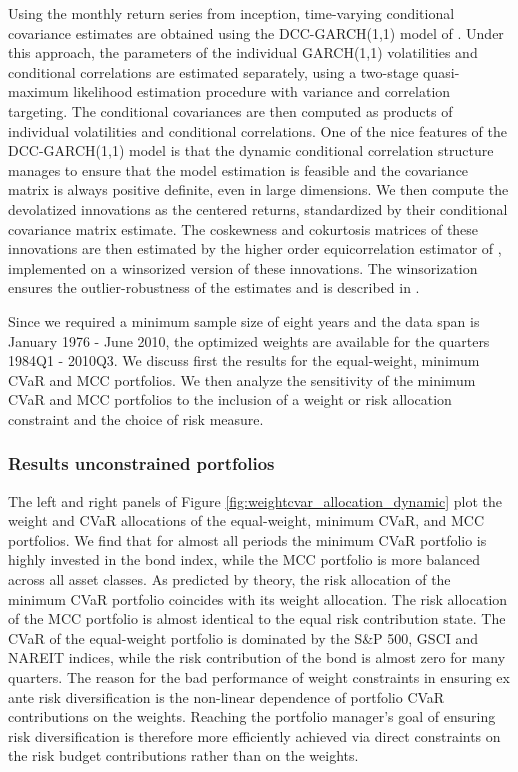 \documentclass[12pt,a4paper]{article}
\begin{document}
Using the monthly return series from inception, time-varying conditional covariance estimates are obtained using the DCC-GARCH(1,1) model of \citet{EngleDCC02}. Under this approach, the parameters of the individual GARCH(1,1) volatilities and conditional correlations are estimated separately, using a two-stage quasi-maximum likelihood estimation procedure with variance and correlation targeting. The conditional covariances are then computed as products of individual volatilities and conditional correlations. One of the nice features of the DCC-GARCH(1,1) model is that the dynamic  conditional correlation structure manages to ensure that the model
estimation is feasible and the covariance matrix is always positive definite, even in large dimensions.
  We then compute the devolatized innovations as the centered returns, standardized by their conditional covariance matrix estimate.  The coskewness and cokurtosis matrices of these innovations are then estimated by the higher order equicorrelation estimator of \citet{MartelliniZiemann2010}, implemented on a winsorized version of these innovations. The winsorization ensures the outlier-robustness of the estimates and is described in \citet{Boudt2007}.

Since we required a minimum sample size of eight years and the data span is January 1976 - June 2010, the optimized weights are available for the quarters 1984Q1 - 2010Q3.
We discuss first the results for the equal-weight, minimum CVaR and MCC portfolios. We then analyze the sensitivity of the minimum CVaR and MCC portfolios to the inclusion of a weight or risk allocation constraint and the choice of risk measure.


\subsubsection{Results unconstrained portfolios}



The left and right panels of Figure \ref{fig:weightcvar_allocation_dynamic} plot the weight and CVaR allocations of the equal-weight, minimum CVaR, and MCC portfolios. We find that for almost all periods the minimum CVaR portfolio is highly invested in the bond index, while the MCC portfolio is more balanced across all asset classes. As predicted by theory, the risk allocation of the minimum CVaR portfolio coincides with its weight allocation. The risk allocation of the MCC portfolio is almost identical to the equal risk contribution state. The CVaR of the equal-weight portfolio is dominated by the S\&P 500, GSCI and NAREIT indices, while the risk contribution of the bond is almost zero for many  quarters.  The reason for the bad performance of weight constraints in ensuring ex ante risk diversification is the non-linear dependence of portfolio CVaR contributions on the weights. Reaching the portfolio manager's goal of ensuring risk diversification is therefore more efficiently achieved via direct constraints on the risk budget contributions rather than on the weights.
\end{document}
